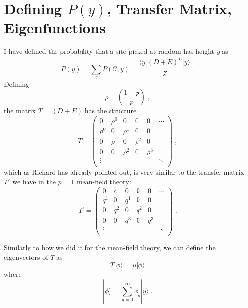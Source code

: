 \documentclass[a4paper,10pt]{article}
\newcommand{\bra}[1]{\langle #1 |}
\newcommand{\ket}[1]{| #1 \rangle}
\begin{document}
\section{Defining $P(y)$, Transfer Matrix, Eigenfunctions}

I have defined the probability that a site picked at random has height $y$ as
\begin{equation}
 P(y) = \sum_{\mathcal{C}} P(\mathcal{C},y) = \frac{\bra{y}  ( D + E)^L \ket{y}}{Z} \;.
\end{equation}
Defining
\begin{equation}
 \rho = \left( \frac{ 1-p}{p} \right) \;,
\end{equation}
the matrix $T = (D+E)$ has the structure
\begin{equation}
  T = \begin{pmatrix}
         0      & \rho^0  & 0      & 0     & 0      & \cdots \\
         \rho^0  & 0      & \rho^1  & 0     & 0      &        \\
         0      & \rho^1  & 0      & \rho^2 & 0      &        \\
         0      & 0      & \rho^2  & 0     & \rho^3  &        \\
       \vdots &        &         &        &         & \ddots \\
      \end{pmatrix} \;,
\end{equation}
which as Richard has already pointed out, is very similar to the transfer matrix $T'$ we have in the $p=1$ mean-field theory:
\begin{equation}
  T' = \begin{pmatrix}
         0      & c    & 0      & 0     & 0      & \cdots \\
         q^1  & 0      & q^1  & 0     & 0      &        \\
         0      & q^2  & 0      & q^2 & 0      &        \\
         0      & 0      & q^3  & 0     & q^3  &        \\
       \vdots &        &         &        &         & \ddots \\
      \end{pmatrix} \;.
\end{equation}

Similarly to how we did it for the mean-field theory, we can define the eigenvectors of $T$ as
\begin{equation}
 T\ket{\phi} = \mu\ket{\phi}
 \end{equation}
where
\begin{equation}
 \ket{\phi} = \sum_{y=0}^\infty \phi_y \ket{y} \;.
\end{equation}
\end{document}
